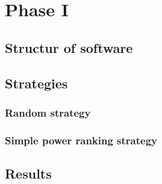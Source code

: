 \chapter{Phase I}

\section{Structur of software}

\section{Strategies}
\subsection{Random strategy}
\subsection{Simple power ranking strategy}

\section{Results}

